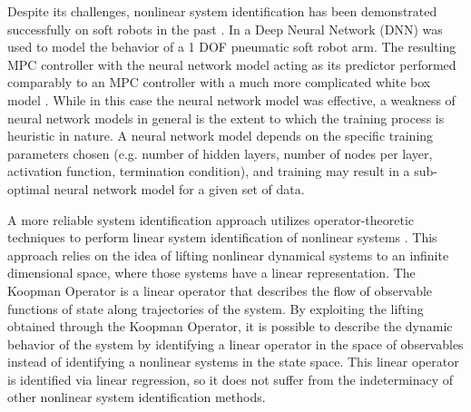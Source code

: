 Despite its challenges, nonlinear system identification has been demonstrated successfully on soft robots in the past .
In \cite{gillespie2018learning} a Deep Neural Network (DNN) was used to model the behavior of a 1 DOF pneumatic soft robot arm.
The resulting MPC  controller with the neural network model acting as its predictor performed comparably to an MPC controller with a much more complicated white box model .
While in this case the neural network model was effective, a weakness of neural network models in general is the extent to which the training process is heuristic in nature.
A neural network model depends on the specific training parameters chosen (e.g. number of hidden layers, number of nodes per layer, activation function, termination condition), and training may result in a sub-optimal neural network model for a given set of data.

A more reliable system identification approach utilizes operator-theoretic techniques to perform linear system identification of nonlinear systems .
This approach relies on the idea of lifting nonlinear dynamical systems to an infinite dimensional space, where those systems have a linear representation.
The Koopman Operator is a linear operator that describes the flow of observable functions of state along trajectories of the system.
By exploiting the lifting obtained through the Koopman Operator, it is possible to describe the dynamic behavior of the system by identifying a linear operator in the space of observables instead of identifying a nonlinear systems in the state space.
This linear operator is identified via linear regression, so it does not suffer from the indeterminacy of other nonlinear system identification methods.

